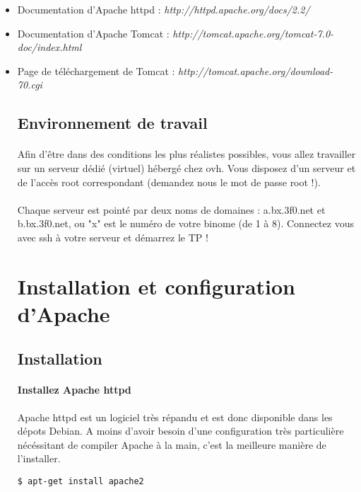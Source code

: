 \documentclass[12pt,a4paper]{article}
\begin{document}
\begin{itemize}
\item Documentation d'Apache httpd : \textit{http://httpd.apache.org/docs/2.2/}
\item Documentation d'Apache Tomcat : \textit{http://tomcat.apache.org/tomcat-7.0-doc/index.html}
\item Page de téléchargement de Tomcat : \textit{http://tomcat.apache.org/download-70.cgi}

\subsection*{Environnement de travail}
\paragraph{}
Afin d'être dans des conditions les plus réalistes possibles, vous allez travailler sur un serveur dédié (virtuel) hébergé chez ovh. Vous disposez d'un serveur et de l'accès root correspondant (demandez nous le mot de passe root !).

\paragraph{}
Chaque serveur est pointé par deux noms de domaines : a.bx.3f0.net et b.bx.3f0.net, ou "x" est le numéro de votre binome (de 1 à 8). Connectez vous avec ssh à votre serveur et démarrez le TP !

\section{Installation et configuration d'Apache}
\subsection{Installation}

\paragraph{Installez Apache httpd\\}
Apache httpd est un logiciel très répandu et est donc disponible dans les dépots Debian. A moins d'avoir besoin d'une configuration très particulière nécéssitant de compiler Apache à la main, c'est la meilleure manière de l'installer.

\begin{lstlisting}
$ apt-get install apache2
\end{lstlisting}


\end{itemize}
\end{document}
